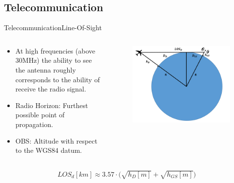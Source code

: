 \subsection{Telecommunication}


\begin{frame}{Telecommunication}{Line-Of-Sight}
  \begin{columns}[T]
    \begin{column}{.5\textwidth}
      \begin{block}{}
        \begin{itemize}
          \item {At high frequencies (above 30MHz) the ability to see the antenna roughly corresponds to the ability of receive the radio signal.}
          \item {Radio Horizon: Furthest possible point of propagation.}
          \item {OBS: Altitude with respect to the WGS84 datum.}
        \end{itemize}
      \end{block}
    \end{column}
    \begin{column}{.5\textwidth}
      \begin{figure}
        \includegraphics[scale=0.25]{figures/LOS.png}
      \end{figure}
    \end{column}
  \end{columns}

    \begin{align*}      
        LOS_d[km]  \approx {3.57\cdot (\sqrt{h_D[m]} + \sqrt{h_{GS}[m]}} )
    \end{align*}

\end{frame}



